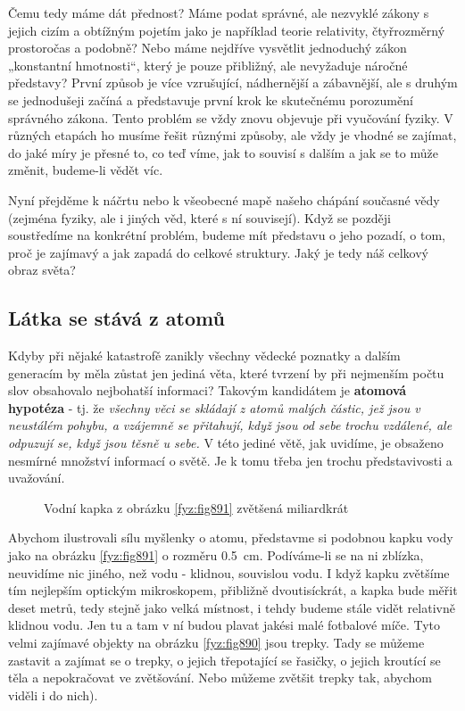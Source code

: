     Čemu tedy máme dát přednost? Máme podat správné, ale nezvyklé zákony s jejich cizím a obtížným 
    pojetím jako je například teorie relativity, čtyřrozměrný prostoročas a podobně? Nebo máme 
    nejdříve vysvětlit jednoduchý zákon „konstantní hmotnosti“, který je pouze přibližný, ale 
    nevyžaduje náročné představy? První způsob je více vzrušující, nádhernější a zábavnější, ale s 
    druhým se jednodušeji začíná a představuje první krok ke skutečnému porozumění správného 
    zákona. Tento problém se vždy znovu objevuje při vyučování fyziky. V různých etapách ho musíme 
    řešit různými způsoby, ale vždy je vhodné se zajímat, do jaké míry je přesné to, co teď víme, 
    jak to souvisí s dalším a jak se to může změnit, budeme-li vědět víc.
    
    Nyní přejděme k náčrtu nebo k všeobecné mapě našeho chápání současné vědy (zejména fyziky, ale 
    i jiných věd, které s ní souvisejí). Když se později soustředíme na konkrétní problém, budeme 
    mít představu o jeho pozadí, o tom, proč je zajímavý a jak zapadá do celkové struktury. Jaký je 
    tedy náš celkový obraz světa? \cite[s.~16]{Feynman01}
    
    \subsection{Látka se stává z atomů}
      Kdyby při nějaké katastrofě zanikly všechny vědecké poznatky a dalším generacím by měla 
      zůstat jen jediná věta, které tvrzení by při nejmenším počtu slov obsahovalo nejbohatší 
      informaci? Takovým kandidátem je \textbf{atomová hypotéza} - tj. že \emph{všechny věci se 
      skládají z atomů malých částic, jež jsou v neustálém pohybu,  a vzájemně se přitahují, když 
      jsou od sebe trochu vzdálené, ale odpuzují se, když jsou těsně u sebe.} V této jediné větě, 
      jak uvidíme, je obsaženo nesmírné množství informací o světě. Je k tomu třeba jen trochu 
      představivosti a uvažování.

      \begin{figure}[ht!]  %
        \centering
        \caption{Vodní kapka z obrázku \ref{fyz:fig891} zvětšená miliardkrát \cite[s.~17]{Feynman01}}
        \label{fyz:fig007}
      \end{figure} 

      Abychom ilustrovali sílu myšlenky o atomu, představme si podobnou kapku vody jako na obrázku
      \ref{fyz:fig891} o rozměru \SI{0.5}{\cm}. Podí\-váme-li se na ni zblízka, neuvidíme nic
      jiného, než vodu - klidnou, souvislou vodu. I když kapku zvětšíme tím nejlepším optickým
      mikroskopem, přibližně dvoutisíckrát, a kapka bude měřit deset metrů, tedy stejně jako velká
      místnost, i tehdy budeme stále vidět relativně klidnou vodu. Jen tu a tam v ní budou plavat
      jakési malé fotbalové míče. Tyto velmi zajímavé objekty na obrázku \ref{fyz:fig890} jsou
      trepky. Tady se můžeme zastavit a zajímat se o trepky, o jejich třepotající se řasičky, o
      jejich kroutící se těla a nepokračovat ve zvětšování. Nebo můžeme zvětšit trepky tak, abychom
      viděli i do nich). 

